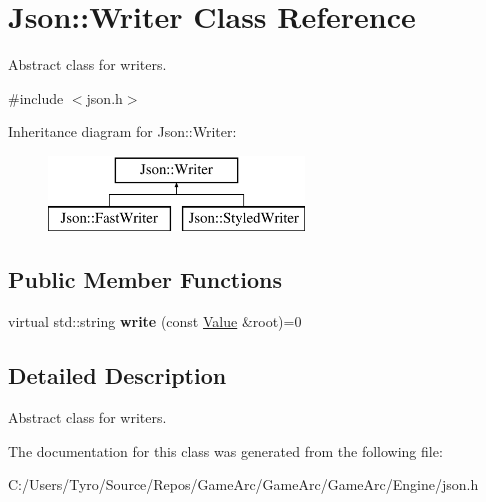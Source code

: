 \hypertarget{class_json_1_1_writer}{}\section{Json\+::Writer Class Reference}
\label{class_json_1_1_writer}


Abstract class for writers.  




{\ttfamily \#include $<$json.\+h$>$}

Inheritance diagram for Json\+::Writer\+:\begin{figure}[H]
\begin{center}
\leavevmode
\includegraphics[height=2.000000cm]{class_json_1_1_writer}
\end{center}
\end{figure}
\subsection*{Public Member Functions}
\begin{DoxyCompactItemize}
\item 
\mbox{\label{class_json_1_1_writer_a7b2273a4ffd6f32b369ac8a53b7b5a0d}} 
virtual std\+::string {\bfseries write} (const \mbox{\hyperlink{class_json_1_1_value}{Value}} \&root)=0
\end{DoxyCompactItemize}


\subsection{Detailed Description}
Abstract class for writers. 

The documentation for this class was generated from the following file\+:\begin{DoxyCompactItemize}
\item 
C\+:/\+Users/\+Tyro/\+Source/\+Repos/\+Game\+Arc/\+Game\+Arc/\+Game\+Arc/\+Engine/json.\+h\end{DoxyCompactItemize}
